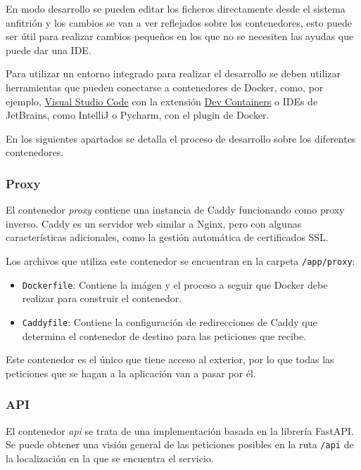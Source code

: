En modo desarrollo se pueden editar los ficheros directamente desde el sistema
anfitrión y los cambios se van a ver reflejados sobre los contenedores, esto
puede ser útil para realizar cambios pequeños en los que no se necesiten las
ayudas que puede dar una IDE.

Para utilizar un entorno integrado para realizar el desarrollo se deben utilizar
herramientas que pueden conectarse a contenedores de Docker, como, por ejemplo,
\href{https://code.visualstudio.com/}{Visual Studio Code} con la extensión
\href{https://marketplace.visualstudio.com/items?itemName=ms-vscode-remote.remote-containers}{Dev
    Containers} o IDEs de JetBrains, como IntelliJ o Pycharm, con el plugin de
Docker.

En los siguientes apartados se detalla el proceso de desarrollo sobre los
diferentes contenedores.

\subsubsection{Proxy}

El contenedor \textit{proxy} contiene una instancia de Caddy funcionando como
proxy inverso. Caddy es un servidor web similar a Nginx, pero con algunas
características adicionales, como la gestión automática de certificados SSL.

Los archivos que utiliza este contenedor se encuentran en la carpeta
\texttt{/app/proxy}:

\begin{itemize}
    \item \texttt{Dockerfile}: Contiene la imágen y el proceso a seguir que
          Docker debe realizar para construir el contenedor.
    \item \texttt{Caddyfile}: Contiene la configuración de redirecciones de
          Caddy que determina el contenedor de destino para las peticiones que
          recibe.
\end{itemize}

Este contenedor es el único que tiene acceso al exterior, por lo que todas las
peticiones que se hagan a la aplicación van a pasar por él.

\subsubsection{API}

El contenedor \textit{api} se trata de una implementación basada en la librería
FastAPI. Se puede obtener una visión general de las peticiones posibles en la
ruta \texttt{/api} de la localización en la que se encuentra el servicio.

